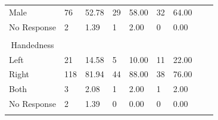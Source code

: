 \documentclass[english,,man,floatsintext]{apa6}
\begin{document}
\begin{appendix}
\begin{table}[htbp]
\begin{threeparttable}
\begin{tabular}{llccccccc}
\multicolumn{1}{l}{Male} & \multicolumn{1}{l}{76} & \multicolumn{1}{l}{52.78} & \multicolumn{1}{l}{29} & \multicolumn{1}{l}{58.00} & \multicolumn{1}{l}{32} & \multicolumn{1}{l}{64.00} \\
\multicolumn{1}{l}{No Response} & \multicolumn{1}{l}{2} & \multicolumn{1}{l}{ 1.39} & \multicolumn{1}{l}{1} & \multicolumn{1}{l}{ 2.00} & \multicolumn{1}{l}{0} & \multicolumn{1}{l}{ 0.00} \\
& & & & & & & \\
\multicolumn{1}{c}{Handedness} & & & & & & \\
\midrule
\multicolumn{1}{l}{Left} & \multicolumn{1}{l}{21} & \multicolumn{1}{l}{14.58} & \multicolumn{1}{l}{5} & \multicolumn{1}{l}{10.00} & \multicolumn{1}{l}{11} & \multicolumn{1}{l}{22.00} \\
\multicolumn{1}{l}{Right} & \multicolumn{1}{l}{118} & \multicolumn{1}{l}{81.94} & \multicolumn{1}{l}{44} & \multicolumn{1}{l}{88.00} & \multicolumn{1}{l}{38} & \multicolumn{1}{l}{76.00} \\
\multicolumn{1}{l}{Both} & \multicolumn{1}{l}{3} & \multicolumn{1}{l}{ 2.08} & \multicolumn{1}{l}{1} & \multicolumn{1}{l}{ 2.00} & \multicolumn{1}{l}{1} & \multicolumn{1}{l}{ 2.00} \\
\multicolumn{1}{l}{No Response} & \multicolumn{1}{l}{2} & \multicolumn{1}{l}{ 1.39} & \multicolumn{1}{l}{0} & \multicolumn{1}{l}{ 0.00} & \multicolumn{1}{l}{0} & \multicolumn{1}{l}{ 0.00} \\
& & & & & \\
\bottomrule
\end{tabular}%
\end{threeparttable}
\end{table}
\end{appendix}
\end{document}
